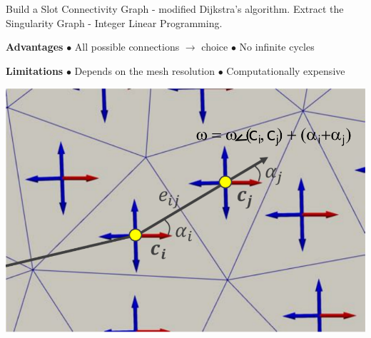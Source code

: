 \documentclass[a0paper,portrait, fontscale=0.30]{baposter}
\begin{document}
\begin{poster}
{\begin{minipage}[!HT]{0.38\linewidth}
\label{fig:figure10}
\end{minipage}
\begin{tcolorbox}[colframe=gray,boxrule=0.01pt,left=0mm,right=0mm,title=\Large Discrete Strategy]
\vspace{-0.2cm} \noindent
Build a Slot Connectivity Graph - modified Dijkstra's algorithm.
\newline
Extract the Singularity Graph - Integer Linear Programming.%
\vspace{0.1cm}
\newline
\begin{minipage}[t]{0.5\linewidth}%
\textbf{Advantages}
\newline
\medskip
\noindent
$\bullet$ All possible connections $\rightarrow$ choice
\vspace{-0.2cm}
\newline
$\bullet$ No infinite cycles
\end{minipage}
\begin{minipage}[t]{0.49\linewidth}	%
\textbf{Limitations}
\newline
\medskip
$\bullet$ Depends on the mesh resolution
\vspace{-0.2cm}
\newline
$\bullet$ Computationally expensive
\newline
\end{minipage}
\vspace{-0.6cm}
\end{tcolorbox}
\vspace{-0.05cm}
\captionsetup{width=0.35\linewidth}
\captionsetup{labelformat=empty}
\hspace{0.05\linewidth}
\begin{minipage}[b]{0.35\linewidth}
\includegraphics[width=0.99\linewidth]{img4_text}

\end{minipage}}
\end{poster}
\end{document}
